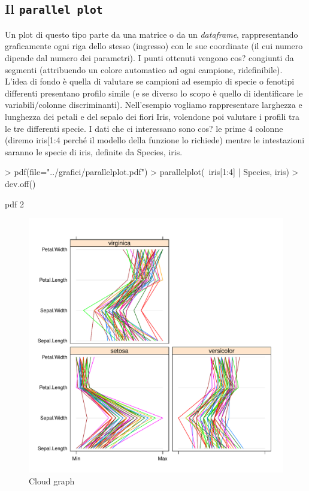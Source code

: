 \documentclass[onecolumn,11pt]{book}
\begin{document}
\subsection{Il \texttt{parallel plot}}
Un plot di questo tipo parte da una matrice o da un \emph{dataframe}, rappresentando graficamente ogni riga dello stesso (ingresso) con le sue coordinate (il cui numero dipende dal numero dei parametri). I punti ottenuti vengono cos? congiunti da segmenti (attribuendo un colore automatico ad ogni campione, ridefinibile). L'idea di fondo \`e quella di valutare se campioni ad esempio di specie o fenotipi differenti presentano profilo simile (e se diverso lo scopo \`e quello di identificare le variabili/colonne discriminanti). 
Nell'esempio vogliamo rappresentare larghezza e lunghezza dei petali e del sepalo dei fiori Iris, volendone poi valutare i profili tra le tre differenti specie. I dati che ci interessano sono cos? le prime 4 colonne (diremo iris[1:4 perch\'e il modello della funzione  lo richiede) mentre le intestazioni saranno le specie di iris, definite da Species, iris.
\begin{Schunk}
\begin{Sinput}
> pdf(file="../grafici/parallelplot.pdf")
> parallelplot(~iris[1:4] | Species, iris)
> dev.off()
\end{Sinput}
\begin{Soutput}
pdf 
  2 
\end{Soutput}
\end{Schunk}
\begin{figure}[htbp]
\begin{center}
\includegraphics[scale=0.6]{../grafici/parallelplot.pdf}
\caption{Cloud graph}
\label{default}
\end{center}
\end{figure} 
\end{document}

